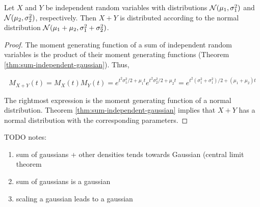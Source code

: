 \begin{thm}
Let $X$ and $Y$ be independent random variables with distributions ${\mathcal{N}}(\mu_1, \sigma_1^2)$ and ${\mathcal{N}}(\mu_2, \sigma_2^2)$, respectively. Then $X + Y$ is distributed according to the normal distribution ${\mathcal{N}}(\mu_1 + \mu_2, \sigma_1^2 + \sigma_2^2)$.
\end{thm}
\begin{proof}
The moment generating function of a sum of independent random variables is the product of their moment generating functions (Theorem \ref{thm:sum-independent-gaussian}). Thus,

\begin{equation}
M_{X + Y}(t) = M_X(t) M_Y(t) = e^{t^2 \sigma_1^2 / 2 + \mu_1 t} e^{t^2 \sigma_2^2 / 2 + \mu_2 t} = e^{t^2 (\sigma_1^2 + \sigma_1^2) / 2 + (\mu_1 + \mu_2) t}
\end{equation}

The rightmost expression is the moment generating function of a normal distribution. Theorem \ref{thm:sum-independent-gaussian} implies that $X + Y$ has a normal distribution with the corresponding parameters. 
\end{proof}

\citep{eisenberg2008sum} 

TODO notes:

\begin{enumerate}
\item sum of gaussians + other densities tends towards Gaussian (central limit theorem\
\item sum of gaussians is a gaussian
\item scaling a gaussian leads to a gaussian
\end{enumerate}

